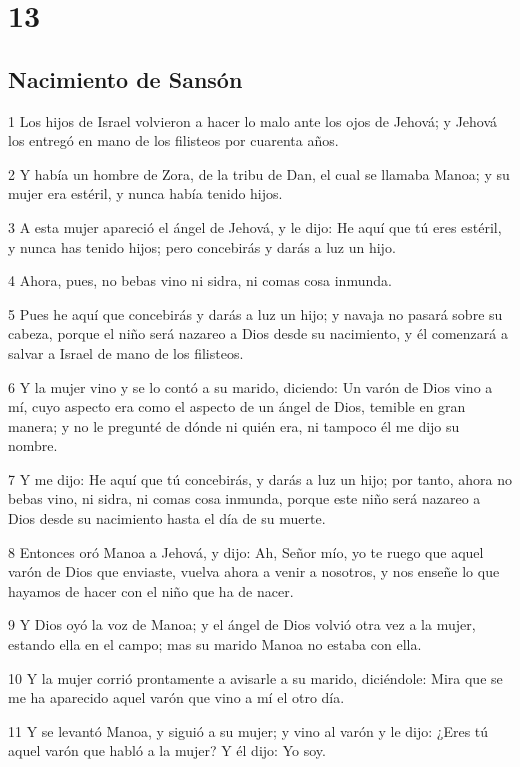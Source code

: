 \chapter{13}

\section*{Nacimiento de Sansón}

\par 1 Los hijos de Israel volvieron a hacer lo malo ante los ojos de Jehová; y Jehová los entregó en mano de los filisteos por cuarenta años.
\par 2 Y había un hombre de Zora, de la tribu de Dan, el cual se llamaba Manoa; y su mujer era estéril, y nunca había tenido hijos.
\par 3 A esta mujer apareció el ángel de Jehová, y le dijo: He aquí que tú eres estéril, y nunca has tenido hijos; pero concebirás y darás a luz un hijo.
\par 4 Ahora, pues, no bebas vino ni sidra, ni comas cosa inmunda.
\par 5 Pues he aquí que concebirás y darás a luz un hijo; y navaja no pasará sobre su cabeza, porque el niño será nazareo a Dios desde su nacimiento, y él comenzará a salvar a Israel de mano de los filisteos.
\par 6 Y la mujer vino y se lo contó a su marido, diciendo: Un varón de Dios vino a mí, cuyo aspecto era como el aspecto de un ángel de Dios, temible en gran manera; y no le pregunté de dónde ni quién era, ni tampoco él me dijo su nombre.
\par 7 Y me dijo: He aquí que tú concebirás, y darás a luz un hijo; por tanto, ahora no bebas vino, ni sidra, ni comas cosa inmunda, porque este niño será nazareo a Dios desde su nacimiento hasta el día de su muerte.
\par 8 Entonces oró Manoa a Jehová, y dijo: Ah, Señor mío, yo te ruego que aquel varón de Dios que enviaste, vuelva ahora a venir a nosotros, y nos enseñe lo que hayamos de hacer con el niño que ha de nacer.
\par 9 Y Dios oyó la voz de Manoa; y el ángel de Dios volvió otra vez a la mujer, estando ella en el campo; mas su marido Manoa no estaba con ella.
\par 10 Y la mujer corrió prontamente a avisarle a su marido, diciéndole: Mira que se me ha aparecido aquel varón que vino a mí el otro día.
\par 11 Y se levantó Manoa, y siguió a su mujer; y vino al varón y le dijo: ¿Eres tú aquel varón que habló a la mujer? Y él dijo: Yo soy.
